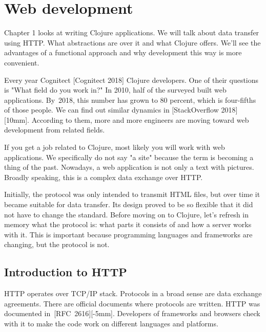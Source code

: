 \chapter{Web development}

\begin{teaser}
Chapter 1 looks at writing Clojure applications. We will talk about data transfer using HTTP. What abstractions are over it and what Clojure offers. We'll see the advantages of a functional approach and why development this way is more convenient.
\end{teaser}


Every year Cognitect [Cognitect 2018] Clojure developers. One of their questions is "What field do you work in?" In 2010, half of the surveyed built web applications. By~2018, this number has grown to 80 percent, which is four-fifths of those people. We can find out similar dynamics in [Stack\-Overflow 2018][10mm].
According to them, more and more engineers are moving toward web development from related fields.

If you get a job related to Clojure, most likely you will work with web applications. We specifically do not say "a site" because the term is becoming a thing of the past. Nowadays, a web application is not only a text with pictures. Broadly speaking, this is a complex data exchange over HTTP.

Initially, the protocol was only intended to transmit HTML files, but over time it became suitable for data transfer. Its design proved to be so flexible that it did not have to change the standard.  Before moving on to Clojure, let's refresh in memory what the protocol is:
what parts it consists of and how a server works with it. This is important because programming languages and frameworks are changing, but the protocol is not.

\section{Introduction to HTTP}


HTTP operates over TCP/IP stack.  Protocols in a broad sense are data exchange agreements. There are official documents where protocols are written. HTTP was documented in [RFC~2616][-5mm].
Developers of frameworks and browsers check with it to make the code work on different languages and platforms.

